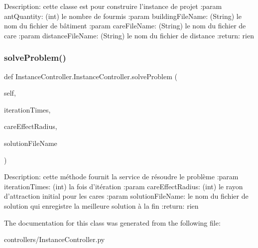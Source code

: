 \begin{DoxyVerb}Description: cette classe est pour construire l'instance de projet
:param antQuantity: (int) le nombre de fourmis
:param buildingFileName: (String) le nom du fichier de bâtiment
:param careFileName: (String) le nom du fichier de care
:param distanceFileName: (String) le nom du fichier de distance
:return: rien
\end{DoxyVerb}
 \mbox{\label{class_instance_controller_1_1_instance_controller_a73f6a84881bc711978453e1af10fbb15}} 
\subsubsection{\texorpdfstring{solve\+Problem()}{solveProblem()}}
{\footnotesize\ttfamily def Instance\+Controller.\+Instance\+Controller.\+solve\+Problem (\begin{DoxyParamCaption}\item[{}]{self,  }\item[{}]{iteration\+Times,  }\item[{}]{care\+Effect\+Radius,  }\item[{}]{solution\+File\+Name }\end{DoxyParamCaption})}

\begin{DoxyVerb}Description: cette méthode fournit la service de résoudre le problème
:param iterationTimes: (int) la fois d'itération
:param careEffectRadius: (int) le rayon d'attraction initial pour les cares
:param solutionFileName: le nom du fichier de solution qui enregistre la meilleure solution à la fin
:return: rien
\end{DoxyVerb}
 

The documentation for this class was generated from the following file\+:\begin{DoxyCompactItemize}
\item 
controllers/Instance\+Controller.\+py\end{DoxyCompactItemize}
